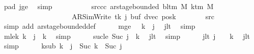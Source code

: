 \begin{isabellebody}
\ pad{}\ jge\ \isamarkupfalse%
\ simp\isanewline
\ \ \ \ \isamarkupfalse%
\isanewline
\ \ \ \ \isamarkupfalse%
\ src{\isacharunderscore}{\kern0pt}cc{\isacharcolon}{\kern0pt}\ {\isachardoublequoteopen}ar{\isacharunderscore}{\kern0pt}stage{\isacharunderscore}{\kern0pt}bounded\ {\isacharparenleft}{\kern0pt}bl{\isacharunderscore}{\kern0pt}tm\ M{\isacharparenright}{\kern0pt}\ {\isacharparenleft}{\kern0pt}k{\isacharunderscore}{\kern0pt}tm\ M{\isacharparenright}{\kern0pt}\isanewline
\ \ \ \ \ \ \ \ \ \ \ \ \ \ \ \ \ \ \ \ {\isacharparenleft}{\kern0pt}AR{\isacharunderscore}{\kern0pt}SimWrite{\isacharcomma}{\kern0pt}\ tk{\isacharcomma}{\kern0pt}\ j{\isacharcomma}{\kern0pt}\ buf{\isacharcomma}{\kern0pt}\ dvec{\isacharcomma}{\kern0pt}\ posk{\isacharparenright}{\kern0pt}{\isachardoublequoteclose}\isanewline
\ \ \ \ \ \ \isamarkupfalse%
\ src{}\ \isamarkupfalse%
\ {\isacharparenleft}{\kern0pt}simp\ add{\isacharcolon}{\kern0pt}\ ar{\isacharunderscore}{\kern0pt}stage{\isacharunderscore}{\kern0pt}bounded{\isacharunderscore}{\kern0pt}def{\isacharparenright}{\kern0pt}\isanewline
\ \ \ \ \isamarkupfalse%
\ mge{}{\isacharcolon}{\kern0pt}\ {\isachardoublequoteopen}{}\ {\isasymle}\ {\isacharquery}{\kern0pt}k\ {\isacharminus}{\kern0pt}\ j{\isachardoublequoteclose}\ \isamarkupfalse%
\ jlt\ \isamarkupfalse%
\ simp\isanewline
\ \ \ \ \isamarkupfalse%
\ mlek{\isacharcolon}{\kern0pt}\ {\isachardoublequoteopen}{\isacharquery}{\kern0pt}k\ {\isacharminus}{\kern0pt}\ j\ {\isasymle}\ {\isacharquery}{\kern0pt}k{\isachardoublequoteclose}\ \isamarkupfalse%
\ simp\isanewline
\ \ \ \ \isamarkupfalse%
\ suc{\isacharunderscore}{\kern0pt}le{\isacharcolon}{\kern0pt}\ {\isachardoublequoteopen}Suc\ j\ {\isasymle}\ {\isacharquery}{\kern0pt}k{\isachardoublequoteclose}\ \isamarkupfalse%
\ jlt\ \isamarkupfalse%
\ simp\isanewline
\ \ \ \ \isamarkupfalse%
\ jlt{}{\isacharcolon}{\kern0pt}\ {\isachardoublequoteopen}j\ {\isacharless}{\kern0pt}\ {}\ {\isacharasterisk}{\kern0pt}\ {\isacharquery}{\kern0pt}k{\isachardoublequoteclose}\ \isamarkupfalse%
\ jlt\ \isamarkupfalse%
\ simp\isanewline
\ \ \ \ \isamarkupfalse%
\ ksub{\isacharcolon}{\kern0pt}\ {\isachardoublequoteopen}{\isacharquery}{\kern0pt}k\ {\isacharminus}{\kern0pt}\ j\ {\isacharequal}{\kern0pt}\ Suc\ {\isacharparenleft}{\kern0pt}{\isacharquery}{\kern0pt}k\ {\isacharminus}{\kern0pt}\ Suc\ j{\isacharparenright}{\kern0pt}{\isachardoublequoteclose}\ \isamarkupfalse%

\end{isabellebody}
